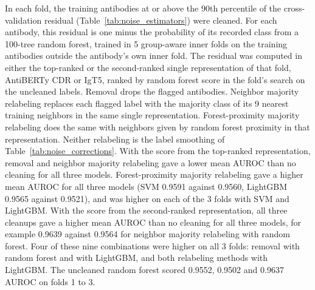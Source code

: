 In each fold, the training antibodies at or above the 90th percentile of the cross-validation residual (Table~\ref{tab:noise_estimators}) were cleaned. For each antibody, this residual is one minus the probability of its recorded class from a 100-tree random forest, trained in 5 group-aware inner folds on the training antibodies outside the antibody's own inner fold. The residual was computed in either the top-ranked or the second-ranked single representation of that fold, AntiBERTy CDR or IgT5, ranked by random forest score in the fold's search on the uncleaned labels. Removal drops the flagged antibodies. Neighbor majority relabeling replaces each flagged label with the majority class of its 9 nearest training neighbors in the same single representation. Forest-proximity majority relabeling does the same with neighbors given by random forest proximity in that representation. Neither relabeling is the label smoothing of Table~\ref{tab:noise_corrections}. With the score from the top-ranked representation, removal and neighbor majority relabeling gave a lower mean AUROC than no cleaning for all three models. Forest-proximity majority relabeling gave a higher mean AUROC for all three models (SVM 0.9591 against 0.9560, LightGBM 0.9565 against 0.9521), and was higher on each of the 3 folds with SVM and LightGBM. With the score from the second-ranked representation, all three cleanups gave a higher mean AUROC than no cleaning for all three models, for example 0.9639 against 0.9564 for neighbor majority relabeling with random forest. Four of these nine combinations were higher on all 3 folds: removal with random forest and with LightGBM, and both relabeling methods with LightGBM. The uncleaned random forest scored 0.9552, 0.9502 and 0.9637 AUROC on folds 1 to 3.

